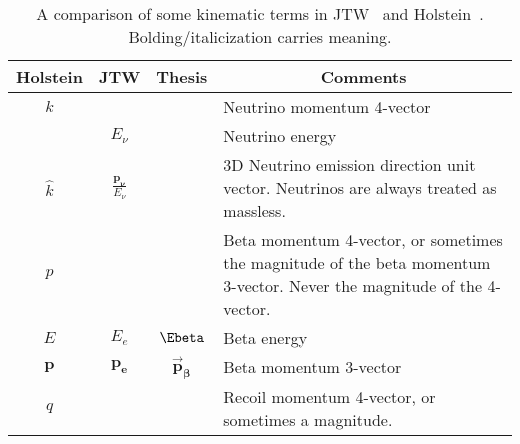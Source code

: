%
%
%
\renewcommand{\arraystretch}{1.6}
\begin{table}[h!!!!t]
	\begin{center}
	\begin{tabular}{ | c | c | c | p{3.35in} | }
		\multicolumn{1}{c}{Holstein} 				& \multicolumn{1}{c}{JTW} 								& \multicolumn{1}{c}{Thesis} 	& \multicolumn{1}{c}{Comments}
		\\  \hline
		$k$											& 														& 								& Neutrino momentum 4-vector%
		\\  \hline
		$ $											& $E_\nu$												& 								& Neutrino energy
		\\  \hline
		$\hat{k}$ 									& $\displaystyle \frac{\mathbf{p_{\bm{\nu}}}}{E_\nu} $	&  %
																																			& 3D Neutrino emission direction unit vector.  Neutrinos are always treated as massless.
		\\  \hline
		$p$											& 														& 								& Beta momentum 4-vector, or sometimes the magnitude of the beta momentum 3-vector.  Never the magnitude of the 4-vector.
		\\  \hline
		$E$											& $E_e$													& $\Ebeta$						& Beta energy
		\\  \hline
		$ \mathbf{p} $								& $\mathbf{p_e}$										& $\bm{\vec{p}_\beta}$			& Beta momentum 3-vector
		\\  \hline
		$q$											&  														&								& Recoil momentum 4-vector, or sometimes a magnitude.
		\\  \hline
	\end{tabular}
	\end{center}
	\caption[Kinematic Terms Guide]{A comparison of some kinematic terms in JTW~\cite{jtw,jtw_coulomb} and Holstein~\cite{holstein,holstein_errata}.  Bolding/italicization carries meaning.  }
	\label{table:compare_notation_kinematic}
\end{table}
\renewcommand{\arraystretch}{1}
%
%